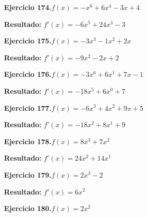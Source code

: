 \documentclass[10pt,a4paper]{article}
\begin{document}
\begin{ejbox}
\textbf{Ejercicio 174.}\quad $f(x) = -x^{6} +6x^{4} -3x +4$
\end{ejbox}

\begin{solbox}
\textbf{Resultado:} \(\displaystyle f'(x) = -6x^{5} +24x^{3} -3\)
\end{solbox}

\newpage
\begin{ejbox}
\textbf{Ejercicio 175.}\quad $f(x) = -3x^3 -1x^2 +2x$
\end{ejbox}

\begin{solbox}
\textbf{Resultado:} \(\displaystyle f'(x) = -9x^2 -2x +2\)
\end{solbox}

\begin{ejbox}
\textbf{Ejercicio 176.}\quad $f(x) = -3x^{6} +6x^{1} +7x -1$
\end{ejbox}

\begin{solbox}
\textbf{Resultado:} \(\displaystyle f'(x) = -18x^{5} +6x^{0} +7\)
\end{solbox}

\begin{ejbox}
\textbf{Ejercicio 177.}\quad $f(x) = -6x^{3} +4x^{2} +9x +5$
\end{ejbox}

\begin{solbox}
\textbf{Resultado:} \(\displaystyle f'(x) = -18x^{2} +8x^{1} +9\)
\end{solbox}

\newpage
\begin{ejbox}
\textbf{Ejercicio 178.}\quad $f(x) = 8x^{3} + 7x^{2}$
\end{ejbox}

\begin{solbox}
\textbf{Resultado:} \(\displaystyle f'(x) = 24x^{2} + 14x^{1}\)
\end{solbox}

\begin{ejbox}
\textbf{Ejercicio 179.}\quad $f(x) = 2x^{3} -2$
\end{ejbox}

\begin{solbox}
\textbf{Resultado:} \(\displaystyle f'(x) = 6x^{2}\)
\end{solbox}

\begin{ejbox}
\textbf{Ejercicio 180.}\quad $f(x) = 2x^{2}$
\end{ejbox}
\end{document}
